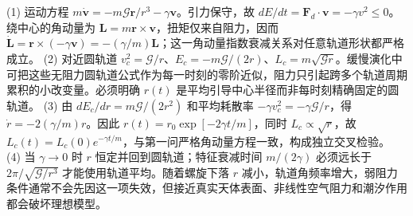(1) 运动方程 \(m\dot{\boldsymbol v}=-m\mathcal G\boldsymbol r/r^3-\gamma\boldsymbol v\)。引力保守，故 \(dE/dt=\boldsymbol F_d\cdot\boldsymbol v=-\gamma v^2\le0\)。绕中心的角动量为 \(\boldsymbol L=m\boldsymbol r\times\boldsymbol v\)，扭矩仅来自阻力，因而 \(\dot{\boldsymbol L}=\boldsymbol r\times(-\gamma\boldsymbol v)=-(\gamma/m)\boldsymbol L\)；这一角动量指数衰减关系对任意轨道形状都严格成立。
(2) 对近圆轨道 \(v_c^2=\mathcal G/r\)、\(E_c=-m\mathcal G/(2r)\)、\(L_c=m\sqrt{\mathcal G r}\)。缓慢演化中可把这些无阻力圆轨道公式作为每一时刻的零阶近似，阻力只引起跨多个轨道周期累积的小改变量。必须明确 \(r(t)\) 是平均引导中心半径而非每时刻精确固定的圆轨道。
(3) 由 \(dE_c/dr=m\mathcal G/(2r^2)\) 和平均耗散率 \(-\gamma v_c^2=-\gamma\mathcal G/r\)，得 \(\dot r=-2(\gamma/m)r\)。因此 \(r(t)=r_0\exp[-2\gamma t/m]\)，同时 \(L_c\propto\sqrt r\)，故 \(L_c(t)=L_c(0)e^{-\gamma t/m}\)，与第一问严格角动量方程一致，构成独立交叉检验。
(4) 当 \(\gamma\to0\) 时 \(r\) 恒定并回到圆轨道；特征衰减时间 \(m/(2\gamma)\) 必须远长于 \(2\pi/\sqrt{\mathcal G/r^3}\) 才能使用轨道平均。随着螺旋下落 \(r\) 减小，轨道角频率增大，弱阻力条件通常不会先因这一项失效，但接近真实天体表面、非线性空气阻力和潮汐作用都会破坏理想模型。
